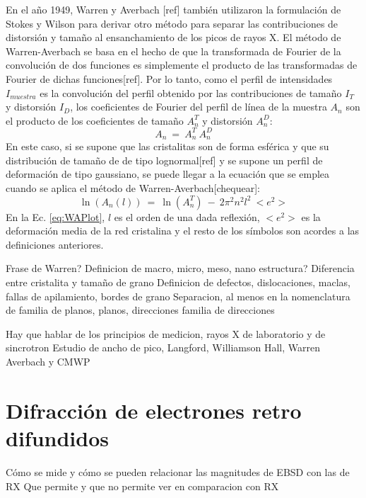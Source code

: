 \noindent
En el año 1949, Warren y Averbach [ref] también utilizaron la formulación de Stokes y Wilson para derivar otro método para separar las contribuciones de distorsión y tamaño al ensanchamiento de los picos de rayos X. 
El método de Warren-Averbach se basa en el hecho de que la transformada de Fourier de la convolución de dos funciones es simplemente el producto de las transformadas de Fourier de dichas funciones[ref].
Por lo tanto, como el perfil de intensidades $I_{muestra}$ es la convolución del perfil obtenido por las contribuciones de tamaño $I_{T}$ y distorsión $I_{D}$, los coeficientes de Fourier del perfil de línea de la muestra $A_n$ son el producto de los coeficientes de tamaño $A_n^T$ y distorsión $A_n^D$:
\begin{equation}
  A_n \ = \ A_n^T \ A_n^D
  \label{eq:FCoeff}
\end{equation}
\noindent
En este caso, si se supone que las cristalitas son de forma esférica y que su distribución de tamaño de de tipo lognormal[ref] y se supone un perfil de deformación de tipo gaussiano, se puede llegar a la ecuación que se emplea cuando se aplica el método de Warren-Averbach[chequear]:
\begin{equation}
  \ln(A_n(l)) \ = \ \ln(A_n^T) \ - \ 2 \pi^2 n^2 l^2 \ <e^2>
  \label{eq:WAPlot}
\end{equation}
\noindent
En la Ec. \ref{eq:WAPlot}, $l$ es el orden de una dada reflexión, $<e^2>$ es la deformación media de la red cristalina y el resto de los símbolos son acordes a las definiciones anteriores.



Frase de Warren?
Definicion de macro, micro, meso, nano estructura?
Diferencia entre cristalita y tamaño de grano
Definicion de defectos, dislocaciones, maclas, fallas de apilamiento, bordes de grano
Separacion, al menos en la nomenclatura de familia de planos, planos, direcciones familia de direcciones

Hay que hablar de los principios de medicion, rayos X de laboratorio y de sincrotron
Estudio de ancho de pico, Langford, Williamson Hall, Warren Averbach y CMWP

\section{Difracción de electrones retro difundidos}\label{S:EBSD}
Cómo se mide y cómo se pueden relacionar las magnitudes de EBSD con las de RX
Que permite y que no permite ver en comparacion con RX

